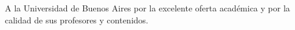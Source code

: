 \documentclass[
    11pt,
    spanish,
    singlespacing,
    parskip,
    headsepline,
    bookmarks=true,
    unicode=true,
    pdftoolbar=true,
    pdfmenubar=true,
    pdffitwindow=false,
    colorlinks=true,
    linkcolor=blue,
    citecolor=blue,
    urlcolor=blue
]{MastersDoctoralThesis}
\def\textbf#1{#1}%
\begin{document}
\begin{acknowledgements}
\vspace{1.5cm}
A la Universidad de Buenos Aires por la excelente oferta académica y por la calidad de sus profesores y contenidos.
\end{acknowledgements}


\tableofcontents
\listoffigures
\listoftables




\mainmatter %
\pagestyle{thesis} %








\appendix




\renewcommand{\bibname}{Bibliografía} %

\printbibliography[heading=bibintoc]
\end{document}
